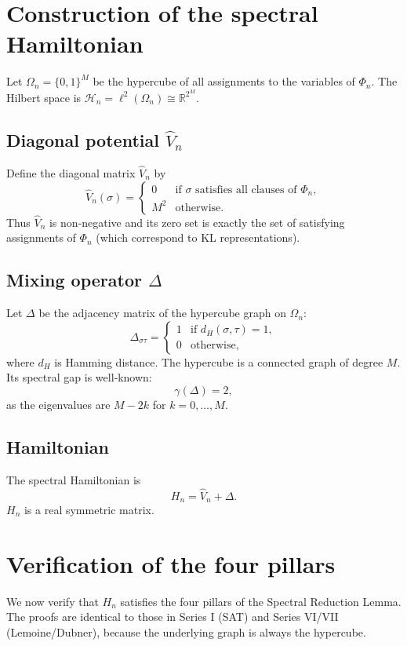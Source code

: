 \documentclass[11pt,a4paper]{article}
\begin{document}
\section{Construction of the spectral Hamiltonian}

Let \(\Omega_n = \{0,1\}^M\) be the hypercube of all assignments to the variables of \(\Phi_n\). The Hilbert space is \(\mathcal{H}_n = \ell^2(\Omega_n) \cong \mathbb{R}^{2^M}\).

\subsection{Diagonal potential \(\hat{V}_n\)}
Define the diagonal matrix \(\hat{V}_n\) by
\[
\hat{V}_n(\sigma) = 
\begin{cases}
0 & \text{if }\sigma\text{ satisfies all clauses of } \Phi_n,\\
M^2 & \text{otherwise}.
\end{cases}
\]
Thus \(\hat{V}_n\) is non‑negative and its zero set is exactly the set of satisfying assignments of \(\Phi_n\) (which correspond to KL representations).

\subsection{Mixing operator \(\Delta\)}
Let \(\Delta\) be the adjacency matrix of the hypercube graph on \(\Omega_n\):
\[
\Delta_{\sigma\tau} = \begin{cases}
1 & \text{if } d_H(\sigma,\tau)=1,\\
0 & \text{otherwise},
\end{cases}
\]
where \(d_H\) is Hamming distance. The hypercube is a connected graph of degree \(M\). Its spectral gap is well‑known:
\[
\gamma(\Delta) = 2,
\]
as the eigenvalues are \(M - 2k\) for \(k=0,\dots,M\).

\subsection{Hamiltonian}
The spectral Hamiltonian is
\[
H_n = \hat{V}_n + \Delta.
\]
\(H_n\) is a real symmetric matrix.

\section{Verification of the four pillars}

We now verify that \(H_n\) satisfies the four pillars of the Spectral Reduction Lemma. The proofs are identical to those in Series I (SAT) and Series VI/VII (Lemoine/Dubner), because the underlying graph is always the hypercube.
\end{document}
